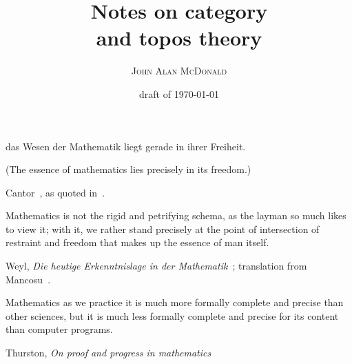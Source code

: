 \documentclass[11pt,openany]{article}
\title{Notes on category \\ and topos theory}
\author{\textsc{John Alan McDonald}}
\date{draft of \today}
\begin{document}
\maketitle

\setcounter{baseSectionLevel}{5}


% 
\epigraph{
das Wesen der Mathematik liegt gerade in ihrer Freiheit.
\par
(The essence of mathematics lies precisely in its freedom.)}%
{Cantor~\cite{Cantor1883},
as quoted in~\cite{ferreiros2007labyrinth}.}

\epigraph{
Mathematics is not the rigid and petrifying schema, 
as the layman so much likes to view it; with it,
 we rather stand precisely at the point of intersection 
 of restraint and freedom that makes up the essence of man itself.}
{Weyl, 
\textit{Die heutige Erkenntnislage in der Mathematik}~\cite{weyl1926heutige};
translation from Mancosu~\cite{mancosu1998brouwer}.}

\epigraph{Mathematics as we practice it is much more formally 
complete and precise than
other sciences, but it is much less formally complete and precise 
for its content than computer programs.}%
{Thurston, 
\textit{On proof and progress in mathematics
}~\cite{thurston1994proof}}
\end{document}
